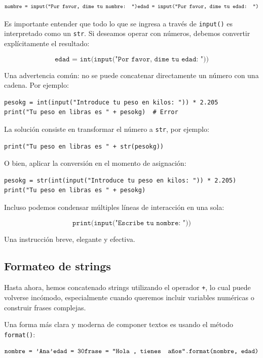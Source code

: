 \documentclass{article}
\theoremstyle{nonumberplain}
\begin{document}
\[
\texttt{nombre = input("Por favor, dime tu nombre: ")} \\
\texttt{edad = input("Por favor, dime tu edad: ")}
\]

Es importante entender que todo lo que se ingresa a través de \texttt{input()} es interpretado como un \texttt{str}. Si deseamos operar con números, debemos convertir explícitamente el resultado:

\[
\texttt{edad = int(input("Por favor, dime tu edad: "))}
\]

Una advertencia común: no se puede concatenar directamente un número con una cadena. Por ejemplo:

\begin{verbatim}
pesokg = int(input("Introduce tu peso en kilos: ")) * 2.205
print("Tu peso en libras es " + pesokg)  # Error
\end{verbatim}

La solución consiste en transformar el número a \texttt{str}, por ejemplo:

\begin{verbatim}
print("Tu peso en libras es " + str(pesokg))
\end{verbatim}

O bien, aplicar la conversión en el momento de asignación:

\begin{verbatim}
pesokg = str(int(input("Introduce tu peso en kilos: ")) * 2.205)
print("Tu peso en libras es " + pesokg)
\end{verbatim}

Incluso podemos condensar múltiples líneas de interacción en una sola:

\[
\texttt{print(input("Escribe tu nombre: "))}
\]

Una instrucción breve, elegante y efectiva.



\subsection*{Formateo de strings}

Hasta ahora, hemos concatenado strings utilizando el operador \texttt{+}, lo cual puede volverse incómodo, especialmente cuando queremos incluir variables numéricas o construir frases complejas.

Una forma más clara y moderna de componer textos es usando el método \texttt{format()}:

\[
\texttt{nombre = 'Ana'} \\
\texttt{edad = 30} \\
\texttt{frase = "Hola {}, tienes {} años".format(nombre, edad)}
\]
\end{document}
